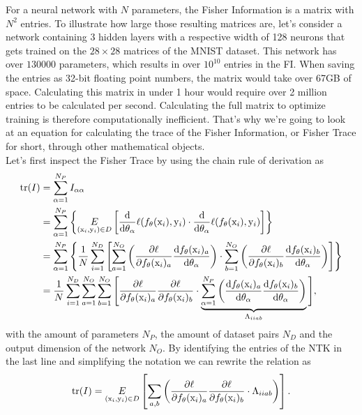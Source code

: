For a neural network with $N$ parameters, the Fisher Information is a matrix with $N^2$ entries. To illustrate how large those resulting matrices are, let's consider a network containing 3 hidden layers with a respective width of 128 neurons that gets trained on the $28\times28$ matrices of the MNIST dataset. This network has over $130000$ parameters, which results in over $10^{10}$ entries in the FI. When saving the entries as 32-bit floating point numbers, the matrix would take over 67GB of space. Calculating  this matrix in under 1 hour would require over 2 million entries to be calculated per second. Calculating the full matrix to optimize training is therefore computationally inefficient. That's why we're going to look at an equation for calculating the trace of the Fisher Information, or Fisher Trace for short, through other mathematical objects.\\
Let's first inspect the Fisher Trace by using the chain rule of derivation as
\begin{equation}
	\begin{split}
		\mathrm{tr}(I) &= \sum_{\alpha = 1}^{N_P} I_{\alpha\alpha}\\
		&= \sum_{\alpha = 1}^{N_P} \left\{\underset{(\mathrm{x}_i, \mathrm{y}_i) \in D}{E} \left[\frac{\mathrm{d}}{\mathrm{d}\theta_\alpha}\ell(f_\theta(\mathrm{x}_i),\mathrm{y}_i)\cdot \frac{\mathrm{d}}{\mathrm{d}\theta_\alpha}\ell(f_\theta(\mathrm{x}_i),\mathrm{y}_i)\right]\right\}\\
		&= \sum_{\alpha = 1}^{N_P} \left\{ \frac{1}{N} \sum_{i = 1}^{N_D} \left[\sum_{a=1}^{N_O}\left(\frac{\partial\ell}{\partial f_\theta(\mathrm{x}_i)_a}\frac{\mathrm{d}f_\theta(\mathrm{x}_i)_a}{\mathrm{d}\theta_\alpha}\right)\cdot\sum_{b=1}^{N_O}\left(\frac{\partial\ell}{\partial f_\theta(\mathrm{x}_i)_b}\frac{\mathrm{d}f_\theta(\mathrm{x}_i)_b}{\mathrm{d}\theta_\alpha}\right)\right]\right\}\\
		&= \frac{1}{N} \sum_{i = 1}^{N_D} \sum_{a=1}^{N_O} \sum_{b=1}^{N_O} \Bigg[\frac{\partial\ell}{\partial f_\theta(\mathrm{x}_i)_a}\frac{\partial\ell}{\partial f_\theta(\mathrm{x}_i)_b} \cdot\underbrace{ \sum_{\alpha = 1}^{N_P} \left(\frac{\mathrm{d}f_\theta(\mathrm{x}_i)_a}{\mathrm{d}\theta_\alpha}\frac{\mathrm{d}f_\theta(\mathrm{x}_i)_b}{\mathrm{d}\theta_\alpha}\right)}_{\Lambda_{iiab}}\Bigg],
	\end{split} 
\end{equation}
with the amount of parameters $N_P$, the amount of dataset pairs $N_D$ and the output dimension of the network $N_O$. By identifying the entries of the NTK in the last line and simplifying the notation we can rewrite the relation as
\begin{equation}\label{eq:FisherNTKRelation}
	\mathrm{tr}(I) = \underset{(\mathrm{x}_i, \mathrm{y}_i) \in D}{E} \left[\sum_{a,b} \left(\frac{\partial\ell}{\partial f_\theta(\mathrm{x}_i)_a}\frac{\partial\ell}{\partial f_\theta(\mathrm{x}_i)_b} \cdot \Lambda_{iiab}\right)\right].
\end{equation}